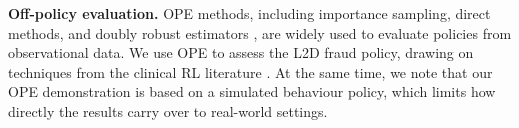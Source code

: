 \textbf{Off-policy evaluation.}
OPE methods, including importance sampling, direct methods, and doubly robust estimators \citep{dudik2011doubly}, are widely used to evaluate policies from observational data. We use OPE to assess the L2D fraud policy, drawing on techniques from the clinical RL literature \citep{tang2022leveraging}. At the same time, we note that our OPE demonstration is based on a simulated behaviour policy, which limits how directly the results carry over to real-world settings.